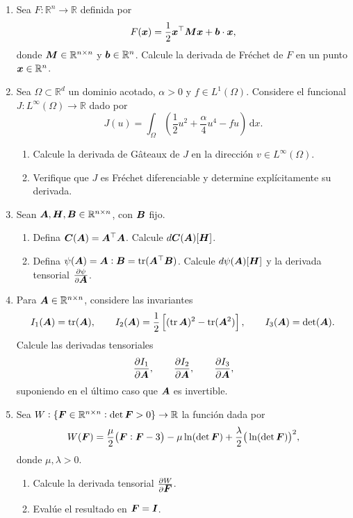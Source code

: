 \documentclass[11pt]{article}
\theoremstyle{thmstyle}
\newcommand{\pd}[2]{\frac{\partial #1}{ \partial #2}}
\def\vec   #1{\mbox{\boldmath $#1$}{}}
\def\ten   #1{\mbox{\boldmath $#1$}{}}
\DeclareMathOperator{\tr}{tr}
\def\dx{\mbox{\(\,\mathrm{d}x\)}}
\def\R{\mathbb R}
\begin{document}
\begin{enumerate}[label=\textbf{\arabic*.}, leftmargin=*]

    \item Sea $F:\R^n\to\R$ definida por
    \[
    F(\vec x)=\frac{1}{2}\vec x^\top \ten M \vec x+\vec b\cdot \vec x,
    \]
    donde $\ten M\in\R^{n\times n}$ y $\vec b\in\R^n$. Calcule la derivada de Fréchet de $F$ en un punto $\vec x\in\R^n$.

    \item Sea $\Omega\subset\R^d$ un dominio acotado, $\alpha>0$ y $f\in L^1(\Omega)$. Considere el funcional $J:L^\infty(\Omega)\to\R$ dado por
    \[
    J(u)=\int_\Omega\left(\frac{1}{2}u^2+\frac{\alpha}{4}u^4-fu\right)\dx.
    \]
    \begin{enumerate}[label=(\alph*)]
        \item Calcule la derivada de Gâteaux de $J$ en la dirección $v\in L^\infty(\Omega)$.
        \item Verifique que $J$ es Fréchet diferenciable y determine explícitamente su derivada.
    \end{enumerate}

    \item Sean $\ten A,\ten H,\ten B\in\R^{n\times n}$, con $\ten B$ fijo.
    \begin{enumerate}[label=(\alph*)]
        \item Defina $\ten C(\ten A)=\ten A^\top \ten A$. Calcule $d\ten C(\ten A)[\ten H]$.
        \item Defina $\psi(\ten A)=\ten A:\ten B=\tr(\ten A^\top \ten B)$. Calcule $d\psi(\ten A)[\ten H]$ y la derivada tensorial $\pd{\psi}{\ten A}$.
    \end{enumerate}

    \item Para $\ten A\in\R^{n\times n}$, considere las invariantes
    \[
    I_1(\ten A)=\tr(\ten A), \qquad
    I_2(\ten A)=\frac{1}{2}\left[(\tr \ten A)^2-\tr(\ten A^2)\right], \qquad
    I_3(\ten A)=\det(\ten A).
    \]
    Calcule las derivadas tensoriales
    \[
    \pd{I_1}{\ten A},\qquad \pd{I_2}{\ten A},\qquad \pd{I_3}{\ten A},
    \]
    suponiendo en el último caso que $\ten A$ es invertible.

    \item Sea $W:\{\ten F\in\R^{n\times n}:\det\ten F>0\}\to\R$ la función dada por
    \[
    W(\ten F)=\frac{\mu}{2}\big(\ten F:\ten F-3\big)-\mu\ln(\det\ten F)+\frac{\lambda}{2}\big(\ln(\det\ten F)\big)^2,
    \]
    donde $\mu,\lambda>0$.
    \begin{enumerate}[label=(\alph*)]
        \item Calcule la derivada tensorial $\pd{W}{\ten F}$.
        \item Evalúe el resultado en $\ten F=\ten I$.
    \end{enumerate}


\end{enumerate}
\end{document}
